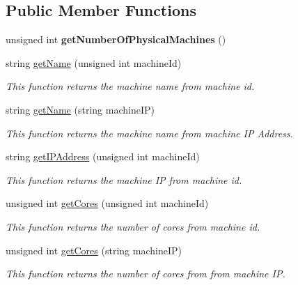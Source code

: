 \subsection*{\-Public \-Member \-Functions}
\begin{DoxyCompactItemize}
\item 
\hypertarget{classPhysicalMachines_af7e8e336548eda3535759deb4aa22b7a}{unsigned int {\bfseries get\-Number\-Of\-Physical\-Machines} ()}\label{classPhysicalMachines_af7e8e336548eda3535759deb4aa22b7a}

\item 
string \hyperlink{classPhysicalMachines_a2586945c95944b42a2b698f421872697}{get\-Name} (unsigned int machine\-Id)
\begin{DoxyCompactList}\small\item\em \-This function returns the machine name from machine id. \end{DoxyCompactList}\item 
string \hyperlink{classPhysicalMachines_a4197eb5ad8dbfef854b34e22b7687e90}{get\-Name} (string machine\-I\-P)
\begin{DoxyCompactList}\small\item\em \-This function returns the machine name from machine \-I\-P \-Address. \end{DoxyCompactList}\item 
string \hyperlink{classPhysicalMachines_afdbed38872654c3d62905f18a8e8a0d9}{get\-I\-P\-Address} (unsigned int machine\-Id)
\begin{DoxyCompactList}\small\item\em \-This function returns the machine \-I\-P from machine id. \end{DoxyCompactList}\item 
unsigned int \hyperlink{classPhysicalMachines_ae3ece1361648efb1d5470436b016e840}{get\-Cores} (unsigned int machine\-Id)
\begin{DoxyCompactList}\small\item\em \-This function returns the number of cores from machine id. \end{DoxyCompactList}\item 
unsigned int \hyperlink{classPhysicalMachines_ac7d6a7a1437adf5a8876c58d628f081f}{get\-Cores} (string machine\-I\-P)
\begin{DoxyCompactList}\small\item\em \-This function returns the number of cores from from machine \-I\-P. \end{DoxyCompactList}\item 

\end{DoxyCompactItemize}
